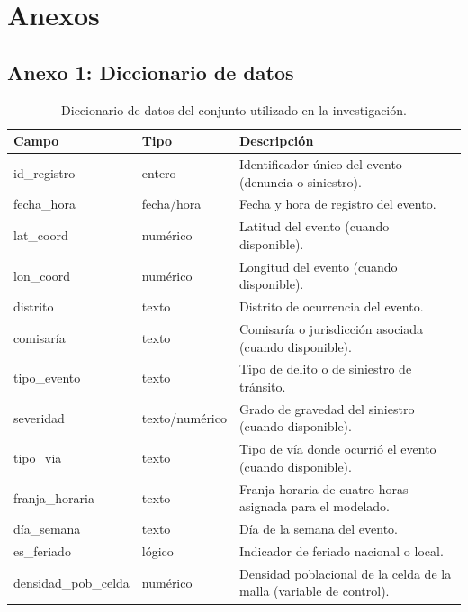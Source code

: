 



\appendix
\chapter*{Anexos}

\section*{Anexo 1: Diccionario de datos}

\begin{table}[H]
\centering
\footnotesize
\caption*{Diccionario de datos del conjunto utilizado en la investigaci\'on.}
\begin{tabular}{p{3.5cm}p{2.5cm}p{5.5cm}}
\toprule
Campo & Tipo & Descripci\'on \\
\midrule
id\_registro & entero & Identificador \'unico del evento (denuncia o siniestro). \\
fecha\_hora & fecha/hora & Fecha y hora de registro del evento. \\
lat\_coord & num\'erico & Latitud del evento (cuando disponible). \\
lon\_coord & num\'erico & Longitud del evento (cuando disponible). \\
distrito & texto & Distrito de ocurrencia del evento. \\
comisar\'ia & texto & Comisar\'ia o jurisdicci\'on asociada (cuando disponible). \\
tipo\_evento & texto & Tipo de delito o de siniestro de tr\'ansito. \\
severidad & texto/num\'erico & Grado de gravedad del siniestro (cuando disponible). \\
tipo\_via & texto & Tipo de v\'ia donde ocurri\'o el evento (cuando disponible). \\
franja\_horaria & texto & Franja horaria de cuatro horas asignada para el modelado. \\
d\'ia\_semana & texto & D\'ia de la semana del evento. \\
es\_feriado & l\'ogico & Indicador de feriado nacional o local. \\
densidad\_pob\_celda & num\'erico & Densidad poblacional de la celda de la malla (variable de control). \\
\bottomrule
\end{tabular}
\end{table}

